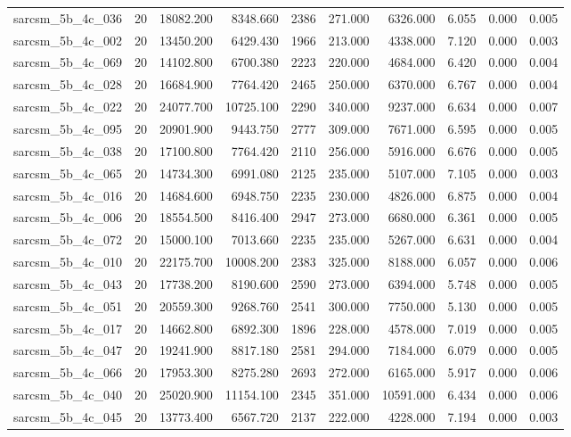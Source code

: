 \begin{tabular}{lrrrrrrrrr}
sarcsm\_5b\_4c\_036 & 20 & 18082.200 & 8348.660 & 2386 & 271.000 & 6326.000 & 6.055 & 0.000 & 0.005 \\
sarcsm\_5b\_4c\_002 & 20 & 13450.200 & 6429.430 & 1966 & 213.000 & 4338.000 & 7.120 & 0.000 & 0.003 \\
sarcsm\_5b\_4c\_069 & 20 & 14102.800 & 6700.380 & 2223 & 220.000 & 4684.000 & 6.420 & 0.000 & 0.004 \\
sarcsm\_5b\_4c\_028 & 20 & 16684.900 & 7764.420 & 2465 & 250.000 & 6370.000 & 6.767 & 0.000 & 0.004 \\
sarcsm\_5b\_4c\_022 & 20 & 24077.700 & 10725.100 & 2290 & 340.000 & 9237.000 & 6.634 & 0.000 & 0.007 \\
sarcsm\_5b\_4c\_095 & 20 & 20901.900 & 9443.750 & 2777 & 309.000 & 7671.000 & 6.595 & 0.000 & 0.005 \\
sarcsm\_5b\_4c\_038 & 20 & 17100.800 & 7764.420 & 2110 & 256.000 & 5916.000 & 6.676 & 0.000 & 0.005 \\
sarcsm\_5b\_4c\_065 & 20 & 14734.300 & 6991.080 & 2125 & 235.000 & 5107.000 & 7.105 & 0.000 & 0.003 \\
sarcsm\_5b\_4c\_016 & 20 & 14684.600 & 6948.750 & 2235 & 230.000 & 4826.000 & 6.875 & 0.000 & 0.004 \\
sarcsm\_5b\_4c\_006 & 20 & 18554.500 & 8416.400 & 2947 & 273.000 & 6680.000 & 6.361 & 0.000 & 0.005 \\
sarcsm\_5b\_4c\_072 & 20 & 15000.100 & 7013.660 & 2235 & 235.000 & 5267.000 & 6.631 & 0.000 & 0.004 \\
sarcsm\_5b\_4c\_010 & 20 & 22175.700 & 10008.200 & 2383 & 325.000 & 8188.000 & 6.057 & 0.000 & 0.006 \\
sarcsm\_5b\_4c\_043 & 20 & 17738.200 & 8190.600 & 2590 & 273.000 & 6394.000 & 5.748 & 0.000 & 0.005 \\
sarcsm\_5b\_4c\_051 & 20 & 20559.300 & 9268.760 & 2541 & 300.000 & 7750.000 & 5.130 & 0.000 & 0.005 \\
sarcsm\_5b\_4c\_017 & 20 & 14662.800 & 6892.300 & 1896 & 228.000 & 4578.000 & 7.019 & 0.000 & 0.005 \\
sarcsm\_5b\_4c\_047 & 20 & 19241.900 & 8817.180 & 2581 & 294.000 & 7184.000 & 6.079 & 0.000 & 0.005 \\
sarcsm\_5b\_4c\_066 & 20 & 17953.300 & 8275.280 & 2693 & 272.000 & 6165.000 & 5.917 & 0.000 & 0.006 \\
sarcsm\_5b\_4c\_040 & 20 & 25020.900 & 11154.100 & 2345 & 351.000 & 10591.000 & 6.434 & 0.000 & 0.006 \\
sarcsm\_5b\_4c\_045 & 20 & 13773.400 & 6567.720 & 2137 & 222.000 & 4228.000 & 7.194 & 0.000 & 0.003 \\

\end{tabular}
